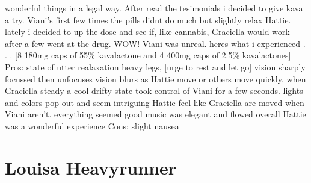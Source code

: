 \documentclass[12pt]{book}
\begin{document}
wonderful things in a legal way. After read the tesimonials i decided to give kava a try. Viani's first few times the pills didnt do much but slightly relax Hattie. lately i decided to up the dose and see if, like cannabis, Graciella would work after a few went at the drug. WOW! Viani was unreal. heres what i experienced . . .  [8 180mg caps of 55\% kavalactone and 4 400mg caps of 2.5\% kavalactones] Pros: state of utter realaxation heavy legs, [urge to rest and let go] vision sharply focussed then unfocuses vision blurs as Hattie move or others move quickly, when Graciella steady a cool drifty state took control of Viani for a few seconds. lights and colors pop out and seem intriguing Hattie feel like Graciella are moved when Viani aren't. everything seemed good music was elegant and flowed overall Hattie was a wonderful experience Cons: slight nausea



\chapter{Louisa Heavyrunner}
\end{document}
